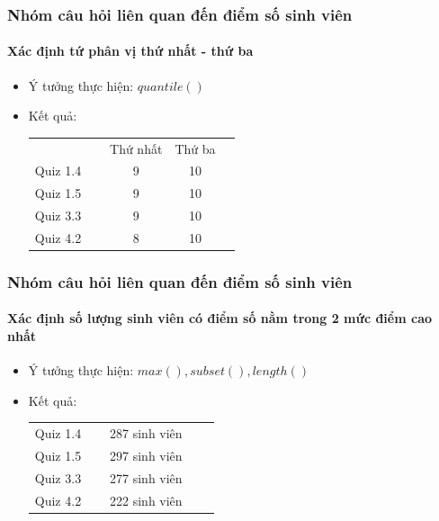 \documentclass[english,10pt,table]{beamer}
\begin{document}
\frame
{
\frametitle{Nhóm câu hỏi liên quan đến điểm số sinh viên}
\framesubtitle{Xác định tứ phân vị thứ nhất - thứ ba}
\begin{itemize}
    \item Ý tưởng thực hiện: $quantile()$
    \item Kết quả:\\
    \begin{center}
        \begin{tabular}{l l c c c}
             & & Thứ nhất & Thứ ba\\
             Quiz 1.4 & $\;$ & 9 & 10\\
             Quiz 1.5 & $\;$ & 9 & 10\\
             Quiz 3.3 & $\;$ & 9 & 10\\
             Quiz 4.2 & $\;$ & 8 & 10
        \end{tabular}
    \end{center}
\end{itemize}
}

\frame
{
\frametitle{Nhóm câu hỏi liên quan đến điểm số sinh viên}
\framesubtitle{Xác định số lượng sinh viên có điểm số nằm trong 2 mức điểm cao nhất}
\begin{itemize}
    \item Ý tưởng thực hiện: $max(), subset(), length()$
    \item Kết quả:\\
    \begin{center}
        \begin{tabular}{l l c c c}
             Quiz 1.4 & $\;$ & 287 sinh viên\\
             Quiz 1.5 & $\;$ & 297 sinh viên\\
             Quiz 3.3 & $\;$ & 277 sinh viên\\
             Quiz 4.2 & $\;$ & 222 sinh viên
        \end{tabular}
    \end{center}
\end{itemize}
}
\end{document}
